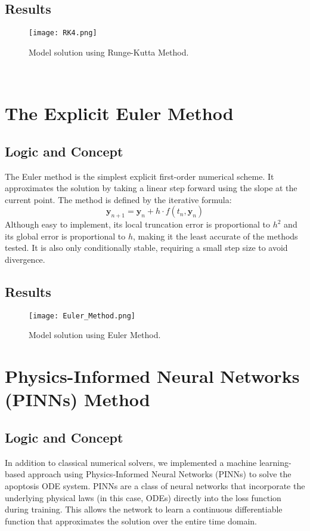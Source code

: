 \documentclass[conference]{IEEEtran}
\begin{document}
\subsection{Results}
\begin{figure}[htbp]
\centerline{\texttt{[image: RK4.png]}}
\caption{Model solution using Runge-Kutta Method.}
\label{fig:rk4}
\end{figure}
\
\
\
\section{The Explicit Euler Method}
\subsection{Logic and Concept}
The Euler method is the simplest explicit first-order numerical scheme. It approximates the solution by taking a linear step forward using the slope at the current point. The method is defined by the iterative formula:
\begin{equation}
\mathbf{y}_{n+1} = \mathbf{y}_n + h \cdot f(t_n, \mathbf{y}_n)
\end{equation}
Although easy to implement, its local truncation error is proportional to $h^2$ and its global error is proportional to $h$, making it the least accurate of the methods tested. It is also only conditionally stable, requiring a small step size to avoid divergence.

\subsection{Results}
\begin{figure}[htbp]
\centerline{\texttt{[image: Euler\_Method.png]}}
\caption{Model solution using Euler Method.}
\label{fig:euler}
\end{figure}

\section{Physics-Informed Neural Networks (PINNs) Method}
\subsection{Logic and Concept}
In addition to classical numerical solvers, we implemented a machine learning-based approach using Physics-Informed Neural Networks (PINNs) to solve the apoptosis ODE system. PINNs are a class of neural networks that incorporate the underlying physical laws (in this case, ODEs) directly into the loss function during training. This allows the network to learn a continuous differentiable function that approximates the solution over the entire time domain.
\end{document}
